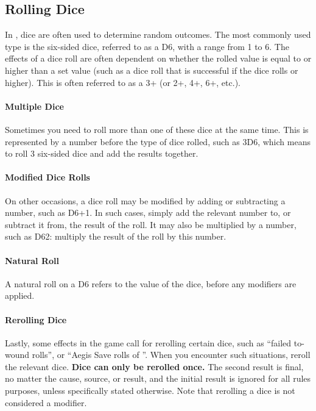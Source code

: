\subsection{Rolling Dice}
\label{rolling_dice}

In \nameofthegame{}, dice are often used to determine random outcomes. The most commonly used type is the six-sided dice, referred to as a D6, with a range from 1 to 6. The effects of a dice roll are often dependent on whether the rolled value is equal to or higher than a set value (such as a dice roll that is successful if the dice rolls  or higher). This is often referred to as a 3+ (or 2+, 4+, 6+, etc.).

\paragraph{Multiple Dice}

Sometimes you need to roll more than one of these dice at the same time. This is represented by a number before the type of dice rolled, such as 3D6, which means to roll 3 six-sided dice and add the results together.

\paragraph{Modified Dice Rolls}

On other occasions, a dice roll may be modified by adding or subtracting a number, such as D6+1. In such cases, simply add the relevant number to, or subtract it from, the result of the roll. It may also be multiplied by a number, such as D6\timess{}2: multiply the result of the roll by this number.

\paragraph{Natural Roll}

A natural roll on a D6 refers to the value of the dice, before any modifiers are applied.

\paragraph{Rerolling Dice}

Lastly, some effects in the game call for rerolling certain dice, such as \enquote{failed to-wound rolls}, or \enquote{Aegis Save rolls of }. When you encounter such situations, reroll the relevant dice. \textbf{Dice can only be rerolled once.} The second result is final, no matter the cause, source, or result, and the initial result is ignored for all rules purposes, unless specifically stated otherwise. Note that rerolling a dice is not considered a modifier.

